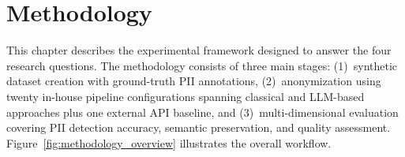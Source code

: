 
\chapter{Methodology}
\label{ch:methodology}

This chapter describes the experimental framework designed to answer the four
research questions. The methodology consists of three main stages:
(1)~synthetic dataset creation with ground-truth PII annotations,
(2)~anonymization using twenty in-house pipeline configurations spanning
classical and LLM-based approaches plus one external API
baseline, and (3)~multi-dimensional evaluation covering PII detection
accuracy, semantic preservation, and quality assessment.
Figure~\ref{fig:methodology_overview} illustrates the overall workflow.

